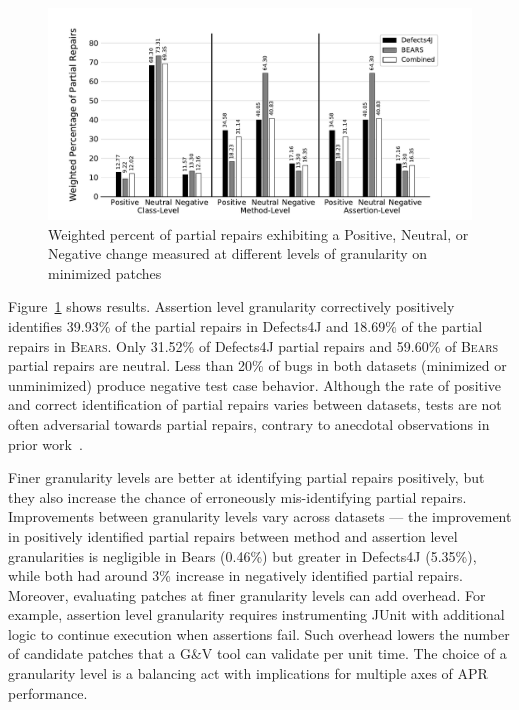 \documentclass[10pt, conference]{IEEEtran}
\newcommand\bears{\textsc{Bears}\xspace}
\begin{document}
\begin{figure}
        \includegraphics[width=1.05\columnwidth]{img/weighted_percent.pdf}
        \caption{Weighted percent of partial repairs exhibiting a {\normalfont Positive}, {\normalfont Neutral}, or {\normalfont Negative} change measured at different levels of granularity on minimized patches}
        \label{fig:fitness}
\end{figure}


Figure~\ref{fig:fitness} shows results.
Assertion level granularity correctively positively identifies
39.93\% of the partial repairs in Defects4J
and 18.69\% of the partial repairs in \bears.
Only 31.52\% of Defects4J partial repairs and 
59.60\% 
of \bears partial repairs are neutral. Less than 20\% of bugs in both datasets
(minimized or unminimized) produce negative test case behavior.
Although the rate of positive and correct identification of partial repairs varies between datasets,
tests are not often adversarial towards partial repairs, contrary to anecdotal
observations in prior work~\cite{gecco09}.

Finer granularity levels are better at identifying partial repairs positively,
but they also increase the chance of erroneously mis-identifying partial repairs.
Improvements between granularity levels vary across datasets --- the improvement 
in positively identified partial repairs between method and assertion level granularities
is negligible in Bears (0.46\%) but greater in Defects4J (5.35\%), while both had around 3\% increase in negatively identified partial repairs.
Moreover, evaluating patches at finer granularity levels can add overhead.
For example, assertion level granularity requires instrumenting JUnit with additional
logic to continue execution when assertions fail.
Such overhead lowers the number of
candidate patches that a G\&V tool can validate per unit time.
The choice of a granularity level is a balancing act with implications for
multiple axes of APR performance.
\end{document}
